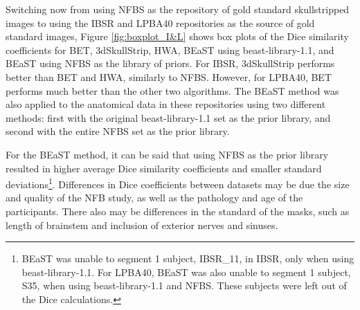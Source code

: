 \documentclass{bmcart}
\begin{document}
Switching now from using NFBS as the repository of gold standard skullstripped images to using the IBSR and LPBA40 repositories as the source of gold standard images, Figure \ref{fig:boxplot_I&L} shows box plots of the Dice similarity coefficients for BET, 3dSkullStrip, HWA, BEaST using beast-library-1.1, and BEaST using NFBS as the library of priors. For IBSR, 3dSkullStrip performs better than BET and HWA, similarly to NFBS. However, for LPBA40, BET performs much better than the other two algorithms. The BEaST method was also applied to the anatomical data in these repositories using two different methods: first with the original beast-library-1.1 set as the prior library, and second with the entire NFBS set as the prior library. 


For the BEaST method, it can be said that using NFBS as the prior library resulted in higher average Dice similarity coefficients and smaller standard deviations\footnote{BEaST was unable to segment 1 subject, IBSR\_11, in IBSR, only when using beast-library-1.1. For LPBA40, BEaST was also unable to segment 1 subject, S35, when using beast-library-1.1 and NFBS. These subjects were left out of the Dice calculations.}. Differences in Dice coefficients between datasets may be due the size and quality of the NFB study, as well as the pathology and age of the participants. There also may be differences in the standard of the masks, such as length of brainstem and inclusion of exterior nerves and sinuses. 
\end{document}
